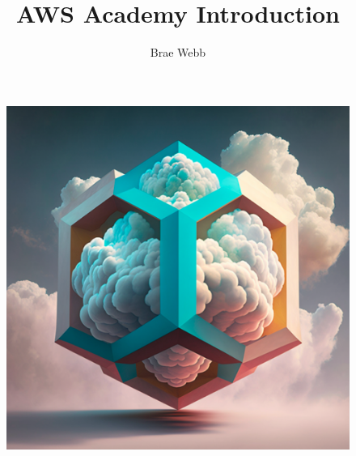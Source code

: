 \documentclass{csse4400}
\title{AWS Academy Introduction}
\author{Brae Webb}
\date{\week{1}}
\begin{document}
\maketitle

\begin{figure}[h]
  \begin{center}
    \includegraphics[scale=0.4]{images/hextriscloud}
  \end{center}
\end{figure}

\end{document}

